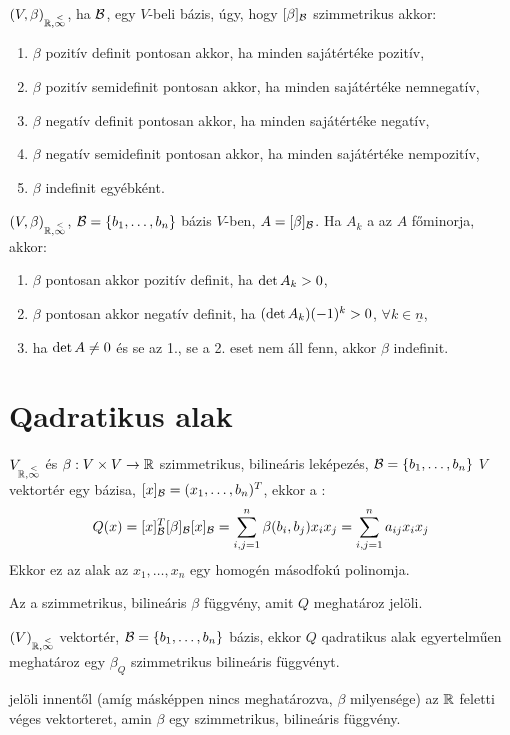 	\begin{all}
		$(V,\beta)_{\mathbb{R},\overset{<}{\infty}}$, ha $\mathcal{B}$, egy $V$-beli bázis, úgy, hogy $[\beta]_{\mathcal{B}}$ 
		szimmetrikus akkor:
		\begin{enumerate}
			\item $\beta$ pozitív definit pontosan akkor, ha minden sajátértéke
				pozitív,
			\item $\beta$ pozitív semidefinit pontosan akkor, ha minden
				sajátértéke nemnegatív,
			\item $\beta$ negatív definit pontosan akkor, ha minden sajátértéke
				negatív,
			\item $\beta$ negatív semidefinit pontosan akkor, ha minden
				sajátértéke nempozitív,
			\item $\beta$ indefinit egyébként.
		\end{enumerate}
	\end{all}
	\begin{all}
		$(V,\beta)_{\mathbb{R},\overset{<}{\infty}}$, $\mathcal{B}=\{b_1,\ldots,b_n\}$ bázis $V$-ben,
		$A=[\beta]_{\mathcal{B}}$. Ha $A_k$ a az $A$ főminorja, akkor:
		\begin{enumerate}
		\item $\beta$ pontosan akkor pozitív definit, ha $\operatorname{det}{A_k}>0$,
		\item $\beta$ pontosan akkor negatív definit, ha $(\operatorname{det}{A_k})(-1)^k>0$,
			$\forall k\in\underline{n}$,
		\item ha $\operatorname{det}{A}\neq 0$ és se az 1., se a 2. eset nem áll fenn, akkor
			$\beta$ indefinit.
		\end{enumerate}
	\end{all}

	\section{Qadratikus alak}
	\begin{ff}
		$V_{\mathbb{R},\overset{<}{\infty}}$ és $\beta:V\times V\to \mathbb{R}$ szimmetrikus, bilineáris leképezés,
		$\mathcal{B}=\{b_1,\ldots,b_n\}$ $V$ vektortér egy bázisa,
		$[x]_{\mathcal{B}}=(x_1,\ldots,b_n)^T$, ekkor a :
		\begin{equation*}
			Q(x)=[x]_{\mathcal{B}}^T[\beta]_{\mathcal{B}}[x]_{\mathcal{B}}=\sum_{i,j=1}^n\beta(b_i,b_j)x_ix_j=\sum_{i,j=1}^n
			a_{ij}x_ix_j
		\end{equation*}
		Ekkor ez az alak az $x_1,\ldots,x_n$ egy homogén másodfokú polinomja.
	\end{ff}
	\begin{jel}
		Az a szimmetrikus, bilineáris $\beta$ függvény, amit $Q$ meghatároz
		 jelöli.
	\end{jel}
	\begin{all}
		$(V)_{\mathbb{R},\overset{<}{\infty}}$ vektortér, $\mathcal{B}=\{b_1,\ldots,b_n\}$ bázis, ekkor $Q$
		qadratikus alak egyertelműen meghatároz egy $\beta_Q$ szimmetrikus
		bilineáris függvényt.
	\end{all}
	\begin{jel}
		 jelöli innentől (amíg másképpen nincs
		meghatározva, $\beta$ milyensége) az $\mathbb{R}$ feletti véges vektorteret,
		amin $\beta$ egy szimmetrikus, bilineáris függvény.
	\end{jel}

